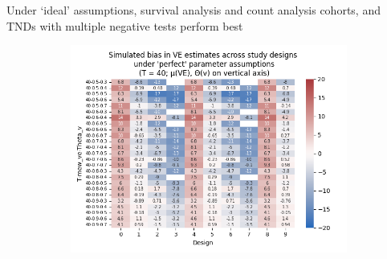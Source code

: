 \documentclass[aspectratio=169]{beamer}
\begin{document}
\begin{frame}{Under `ideal' assumptions, survival analysis and count analysis cohorts, and TNDs with multiple negative tests perform best}
\begin{figure}[H]
\begin{subfigure}[c]{0.31\linewidth}
		\end{subfigure}
		\begin{subfigure}[c]{0.31\linewidth}
			\centering
			\includegraphics[scale=0.28]{VEMethod_Sim1b_PureDesignBias_Heatmap40.png}
		\end{subfigure}
	

\end{figure}
\end{frame}
\end{document}
